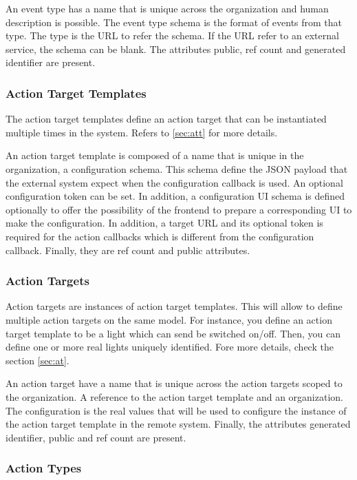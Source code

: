 An event type has a name that is unique across the organization and human description is possible. The event type schema is the format of events from that type. The type is the URL to refer the schema. If the URL refer to an external service, the schema can be blank. The attributes public, ref count and generated identifier are present.

\subsubsection{Action Target Templates}

The action target templates define an action target that can be instantiated multiple times in the system. Refers to \ref{sec:att} for more details.

An action target template is composed of a name that is unique in the organization, a configuration schema. This schema define the JSON payload that the external system expect when the configuration callback is used. An optional configuration token can be set. In addition, a configuration UI schema is defined optionally to offer the possibility of the frontend to prepare a corresponding UI to make the configuration. In addition, a target URL and its optional token is required for the action callbacks which is different from the configuration callback. Finally, they are ref count and public attributes.

\subsubsection{Action Targets}

Action targets are instances of action target templates. This will allow to define multiple action targets on the same model. For instance, you define an action target template to be a light which can send be switched on/off. Then, you can define one or more real lights uniquely identified. Fore more details, check the section \ref{sec:at}.

An action target have a name that is unique across the action targets scoped to the organization. A reference to the action target template and an organization. The configuration is the real values that will be used to configure the instance of the action target template in the remote system. Finally, the attributes generated identifier, public and ref count are present.

\subsubsection{Action Types}

